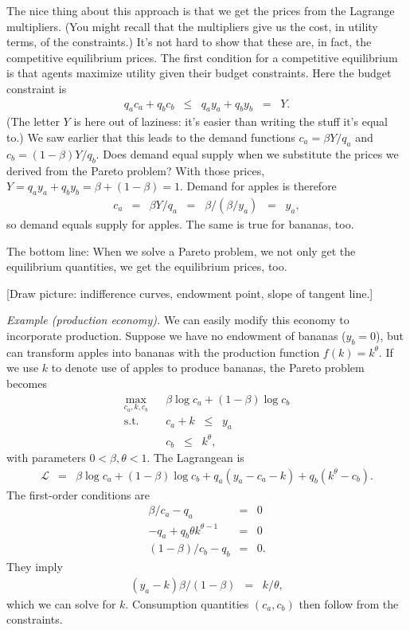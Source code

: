 \documentclass[11pt]{article}
\begin{document}
The nice thing about this approach is that
we get the prices from the Lagrange multipliers.
(You might recall that the multipliers give us the cost, in utility terms,
of the constraints.)
It's not hard to show that these are, in fact,
the competitive equilibrium prices.
The first condition for a competitive equilibrium is that agents maximize
utility given their budget constraints.
Here the budget constraint is
\begin{eqnarray*}
    q_a c_a + q_b c_b &\leq& q_a y_a + q_b y_b \;\;=\;\; Y.
\end{eqnarray*}
(The letter $Y$ is here out of laziness:  it's easier than writing
the stuff it's equal to.)
We saw earlier that this leads to the demand functions
$ c_a = \beta Y/q_a$ and $c_b = (1-\beta) Y/q_b$.
Does demand equal supply when we substitute the prices we derived
from the Pareto problem?
With those prices,
$ Y = q_a y_a + q_b y_b = \beta + (1-\beta) = 1$.
Demand for apples is therefore
\begin{eqnarray*}
    c_a &=& \beta Y / q_a \;\;=\;\; \beta / (\beta/y_a) \;\;=\;\; y_ a,
\end{eqnarray*}
so demand equals supply for apples.
The same is true for bananas, too.

The bottom line:  When we solve a Pareto problem,
we not only get the equilibrium quantities,
we get the equilibrium prices, too.


[Draw picture:  indifference curves, endowment point,
slope of tangent line.]

{\it Example (production economy).\/}
We can easily modify this economy to incorporate production.
Suppose we have no endowment of bananas ($y_b=0$),
but can transform apples into bananas with the
production function $f(k) = k^\theta$.
If we use $k$ to denote use of apples to produce bananas,
the Pareto problem becomes
\begin{eqnarray*}
    \max_{c_a,k,c_b} &&  \beta \log c_a + (1-\beta) \log c_b \\
    \mbox{s.t.}   &&  c_a + k \;\;\leq\;\; y_a \\
                  &&  c_b \;\;\leq\;\; k^\theta ,
\end{eqnarray*}
with parameters $ 0 < \beta,\theta < 1$.
The Lagrangean is
\begin{eqnarray*}
    \mathcal{L} &=&  \beta \log c_a + (1-\beta) \log c_b
                + q_a (y_a - c_a - k) + q_b (k^\theta - c_b ) .
\end{eqnarray*}
The first-order conditions are
\begin{eqnarray*}
    \beta/c_a - q_a &=& 0 \\
    - q_a + q_b \theta k^{\theta-1} &=& 0 \\
   (1-\beta)/c_b - q_b &=& 0 .
\end{eqnarray*}
They imply
\begin{eqnarray*}
    (y_a - k) \beta /(1-\beta) &=& k / \theta ,
\end{eqnarray*}
which we can solve for $k$.
Consumption quantities $(c_a,c_b)$ then follow from the
constraints.
\end{document}
